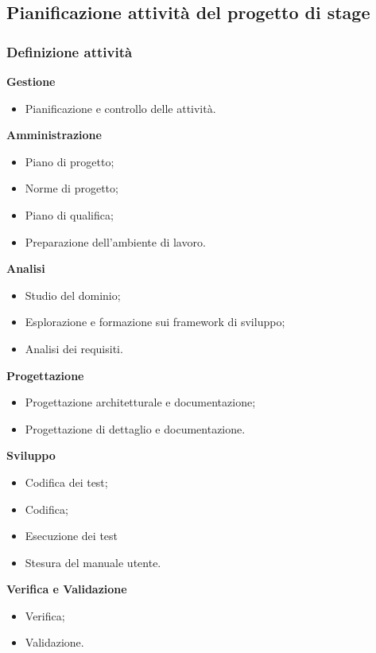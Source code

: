\documentclass[a4paper]{article}
\begin{document}
\subsection{Pianificazione attività del progetto di stage}

\subsubsection{Definizione attività}
\textbf{Gestione}
\begin{itemize}
	\item Pianificazione e controllo delle attività.
\end{itemize}

\noindent
\textbf{Amministrazione}
\begin{itemize}
	\item Piano di progetto;
    \item Norme di progetto;
    \item Piano di qualifica;
    \item Preparazione dell'ambiente di lavoro.
\end{itemize}

\noindent
\textbf{Analisi}
\begin{itemize}
	\item Studio del dominio;
    \item Esplorazione e formazione sui framework di sviluppo;
    \item Analisi dei requisiti.
\end{itemize}

\noindent
\textbf{Progettazione}
\begin{itemize}
	\item Progettazione architetturale e documentazione;
	\item Progettazione di dettaglio e documentazione.
\end{itemize}

\noindent
\textbf{Sviluppo}
\begin{itemize}
	\item Codifica dei test;
    \item Codifica;
    \item Esecuzione dei test
	\item Stesura del manuale utente.
\end{itemize}

\noindent
\textbf{Verifica e Validazione}
\begin{itemize}
	\item Verifica;
	\item Validazione.
\end{itemize}
\end{document}
